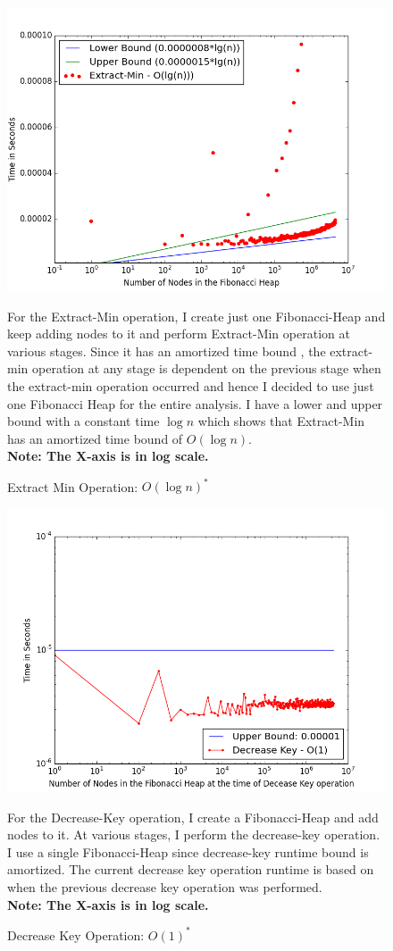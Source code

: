 \begin{figure}
\includegraphics[width=0.95\columnwidth]{Figures/fibonacciHeapPerformanceExtractMin}
\caption{Extract Min Operation: $O(\log{n})^{*}$}
\label{performanceExtractMin}
For the Extract-Min operation, I create just one Fibonacci-Heap and keep adding nodes to it and perform Extract-Min operation at various stages. Since it has an amortized time bound , the extract-min operation at any stage is dependent on the previous stage when the extract-min operation occurred and hence I decided to use just one Fibonacci Heap for the entire analysis. I have a lower and upper bound with a constant time $\log{n}$ which shows that Extract-Min has an amortized time bound of $O(\log{n})$.\\ \textbf{Note: The X-axis is in log scale.}
\end{figure}
\begin{figure}
\includegraphics[width=0.95\columnwidth]{Figures/fibonacciHeapPerformanceDecreaseKey}
\caption{Decrease Key Operation: $O(1)^{*}$}
\label{performanceDecreaseKey}
For the Decrease-Key operation, I create a Fibonacci-Heap and add nodes to it. At various stages, I perform the decrease-key operation. I use a single Fibonacci-Heap since decrease-key runtime bound is amortized. The current decrease key operation runtime is based on when the previous decrease key operation was performed.\\ \textbf{Note: The X-axis is in log scale.}
\end{figure}
